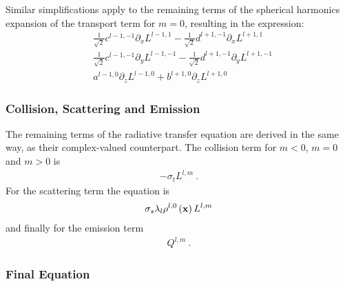 Similar simplifications apply to the remaining terms of the spherical harmonics expansion of the transport term for $m=0$, resulting in the expression:
\begin{align}
\label{eq:pn_rvalued_transport_m0}
&
\frac{1}{\sqrt{2}}c^{{l-1,-1}}\partial_x L^{{l-1,1}}
-\frac{1}{\sqrt{2}}d^{{l+1,-1}}\partial_x L^{{l+1,1}}
\\&
\frac{1}{\sqrt{2}}c^{{l-1,-1}}\partial_y L^{{l-1,-1}}
-\frac{1}{\sqrt{2}}d^{{l+1,-1}}\partial_y L^{{l+1,-1}}
\\&
a^{{l-1,0}}\partial_z L^{{l-1,0}}
+b^{{l+1,0}}\partial_z L^{{l+1,0}}
\end{align}

\subsubsection*{Collision, Scattering and Emission}

The remaining terms of the radiative transfer equation are derived in the same way, as their complex-valued counterpart. The collision term for $m < 0$, $m=0$ and $m > 0$ is
\begin{align}
\label{eq:pn_rvalued_transport_collision}
-\sigma_t L^{l,m}
\ .
\end{align}
For the scattering term the equation is
\begin{align}
\label{eq:pn_rvalued_transport_scattering}
\sigma_s\lambda_{l}\rho^{l,0}\left(\boldsymbol{\mathbf{x}}\right)L^{l,m}
\end{align}
and finally for the emission term
\begin{align}
\label{eq:pn_rvalued_transport_emission}
Q^{l,m}
\ .
\end{align}

\subsubsection*{Final Equation}

